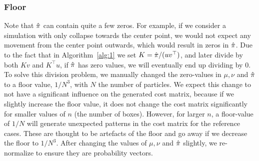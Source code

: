 \subsubsection{Floor}
Note that $\hat{\pi}$ can contain quite a few zeros. For example, if we consider a simulation with only collapse towards the center point, we would not expect any movement from the center point outwards, which would result in zeros in $\hat{\pi}$. Due to the fact that in Algorithm~\ref{alg:1} we set $K = \hat{\pi}/(uv^\top)$, and later divide by both $Kv$ and $K^\top u$, if $\hat{\pi}$ has zero values, we will eventually end up dividing by $0$. To solve this division problem, we manually changed the zero-values in $\mu, \nu$ and $\hat{\pi}$ to a floor value, $1/N^3$, with $N$ the number of particles. We expect this change to not have a significant influence on the generated cost matrix, because if we slightly increase the floor value, it does not change the cost matrix significantly for smaller values of $n$ (the number of boxes). However, for larger $n$, a floor-value of $1/N$ will generate unexpected patterns in the cost matrix for the reference cases. These are thought to be artefacts of the floor and go away if we decrease the floor to $1/N^3$. After changing the values of $\mu, \nu$ and $\hat{\pi}$ slightly, we re-normalize to ensure they are probability vectors. 
 
